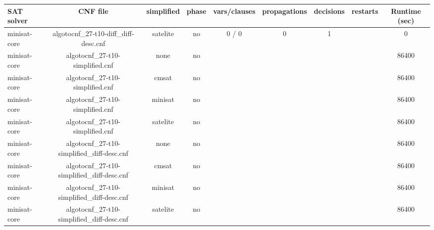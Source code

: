 \begin{appendices}
\begin{table}[p]
  \begin{center}
    \begin{tabular}{l|cccccccc}
        \textbf{SAT solver} & \textbf{CNF file} & \textbf{simplified} & \textbf{phase} & \textbf{vars/clauses} & \textbf{propagations} & \textbf{decisions} & \textbf{restarts} & \textbf{Runtime (sec)} \\
      \hline
  minisat-core                   & algotocnf\_27-t10-diff\_diff-desc.cnf & satelite   & no    & 0 / 0      & 0         & 1         &            & 0 \\ %
  minisat-core                   & algotocnf\_27-t10-simplified.cnf & none       & no    &            &           &           &            & 86400 \\ %
  minisat-core                   & algotocnf\_27-t10-simplified.cnf & cmsat      & no    &            &           &           &            & 86400 \\ %
  minisat-core                   & algotocnf\_27-t10-simplified.cnf & minisat    & no    &            &           &           &            & 86400 \\ %
  minisat-core                   & algotocnf\_27-t10-simplified.cnf & satelite   & no    &            &           &           &            & 86400 \\ %
  minisat-core                   & algotocnf\_27-t10-simplified\_diff-desc.cnf & none       & no    &            &           &           &            & 86400 \\ %
  minisat-core                   & algotocnf\_27-t10-simplified\_diff-desc.cnf & cmsat      & no    &            &           &           &            & 86400 \\ %
  minisat-core                   & algotocnf\_27-t10-simplified\_diff-desc.cnf & minisat    & no    &            &           &           &            & 86400 \\ %
  minisat-core                   & algotocnf\_27-t10-simplified\_diff-desc.cnf & satelite   & no    &            &           &           &            & 86400 \\ %

\end{tabular}
\end{center}
\end{table}
\end{appendices}
